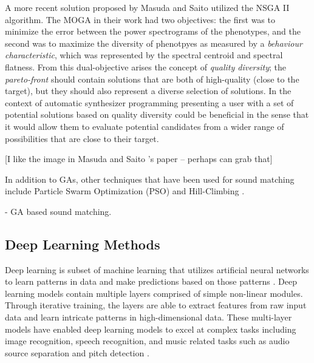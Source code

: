 A more recent solution proposed by Masuda and Saito \cite{masudo2021quality} utilized the NSGA II algorithm. The MOGA in their work had two objectives: the first was to minimize the error between the power spectrograms of the phenotypes, and the second was to maximize the diversity of phenotpyes as measured by a \textit{behaviour characteristic}, which was represented by the spectral centroid and spectral flatness. From this dual-objective arises the concept of \textit{quality diversity}; the \textit{pareto-front} should contain solutions that are both of high-quality (close to the target), but they should also represent a diverse selection of solutions. In the context of automatic synthesizer programming presenting a user with a set of potential solutions based on quality diversity could be beneficial in the sense that it would allow them to evaluate potential candidates from a wider range of possibilities that are close to their target.

[I like the image in Masuda and Saito 's paper -- perhaps can grab that]

In addition to GAs, other techniques that have been used for sound matching include Particle Swarm Optimization (PSO) \cite{heise2009automatic} and Hill-Climbing \cite{roth2011comparison, luke2019stochastic}.

\cite{masudo2021quality} - GA based sound matching.

\subsection{Deep Learning Methods}
Deep learning is subset of machine learning that utilizes artificial neural networks to learn patterns in data and make predictions based on those patterns \cite{lecun2015deep}. Deep learning models contain multiple layers comprised of simple non-linear modules. Through iterative training, the layers are able to extract features from raw input data and learn intricate patterns in high-dimensional data. These multi-layer models have enabled deep learning models to excel at complex tasks including image recognition, speech recognition, and music related tasks such as audio source separation \cite{spleeter2019} and pitch detection \cite{kim2018crepe}.

